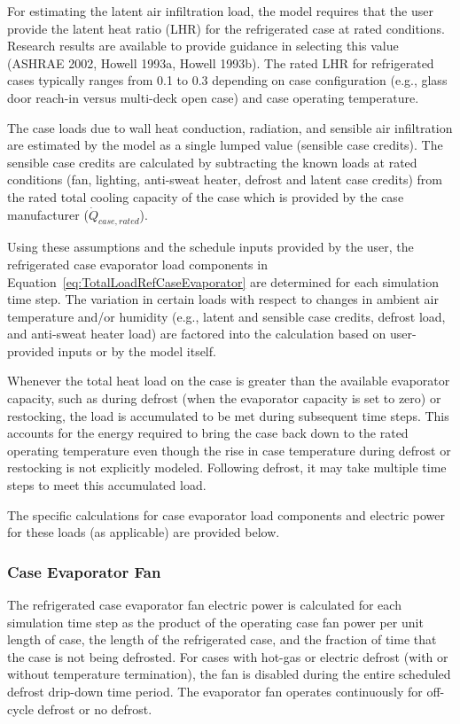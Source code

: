 For estimating the latent air infiltration load, the model requires that the user provide the latent heat ratio (LHR) for the refrigerated case at rated conditions. Research results are available to provide guidance in selecting this value (ASHRAE 2002, Howell 1993a, Howell 1993b). The rated LHR for refrigerated cases typically ranges from 0.1 to 0.3 depending on case configuration (e.g., glass door reach-in versus multi-deck open case) and case operating temperature.

The case loads due to wall heat conduction, radiation, and sensible air infiltration are estimated by the model as a single lumped value (sensible case credits). The sensible case credits are calculated by subtracting the known loads at rated conditions (fan, lighting, anti-sweat heater, defrost and latent case credits) from the rated total cooling capacity of the case which is provided by the case manufacturer (\({\dot Q_{case,rated}}\)).

Using these assumptions and the schedule inputs provided by the user, the refrigerated case evaporator load components in Equation~\ref{eq:TotalLoadRefCaseEvaporator} are determined for each simulation time step. The variation in certain loads with respect to changes in ambient air temperature and/or humidity (e.g., latent and sensible case credits, defrost load, and anti-sweat heater load) are factored into the calculation based on user-provided inputs or by the model itself.

Whenever the total heat load on the case is greater than the available evaporator capacity, such as during defrost (when the evaporator capacity is set to zero) or restocking, the load is accumulated to be met during subsequent time steps. This accounts for the energy required to bring the case back down to the rated operating temperature even though the rise in case temperature during defrost or restocking is not explicitly modeled. Following defrost, it may take multiple time steps to meet this accumulated load.

The specific calculations for case evaporator load components and electric power for these loads (as applicable) are provided below.

\subsubsection{Case Evaporator Fan}\label{case-evaporator-fan}

The refrigerated case evaporator fan electric power is calculated for each simulation time step as the product of the operating case fan power per unit length of case, the length of the refrigerated case, and the fraction of time that the case is not being defrosted. For cases with hot-gas or electric defrost (with or without temperature termination), the fan is disabled during the entire scheduled defrost drip-down time period. The evaporator fan operates continuously for off-cycle defrost or no defrost.

